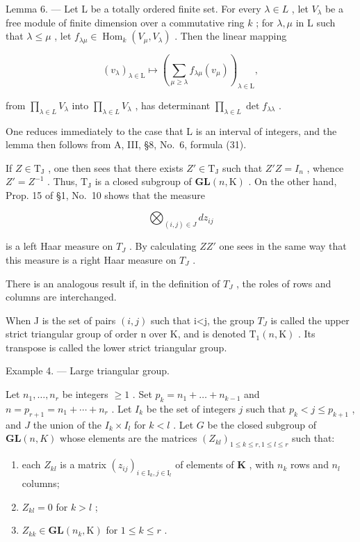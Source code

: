 Lemma 6. --- Let L be a totally ordered finite set. For every \(\lambda \in L\) , let \(V_{\lambda}\) be a free module of finite dimension over a commutative ring \(k\) ; for \(\lambda, \mu\) in L such that \(\lambda \leqslant \mu\) , let \(f_{\lambda \mu} \in \operatorname{Hom}_k(V_\mu, V_\lambda)\) . Then the linear mapping

\[
(v _ {\lambda}) _ {\lambda \in \mathrm{L}} \mapsto \left(\sum_ {\mu \geqslant \lambda} f _ {\lambda \mu} (v _ {\mu})\right) _ {\lambda \in \mathrm{L}},
\]

from \(\prod_{\lambda \in L}V_{\lambda}\) into \(\prod_{\lambda \in L}V_{\lambda}\) , has determinant \(\prod_{\lambda \in L}\det f_{\lambda \lambda}\) .

One reduces immediately to the case that L is an interval of integers, and the lemma then follows from A, III, §8, No.~6, formula (31).

If \(Z \in \mathrm{T}_{\mathrm{J}}\) , one then sees that there exists \(Z' \in \mathrm{T}_{\mathrm{J}}\) such that \(Z'Z = I_n\) , whence \(Z' = Z^{-1}\) . Thus, \(\mathrm{T}_{\mathrm{J}}\) is a closed subgroup of \(\mathbf{GL}(n,\mathrm{K})\) . On the other hand, Prop. 15 of §1, No.~10 shows that the measure

\[
\bigotimes_ {(i, j) \in J} d z _ {i j}
\]

is a left Haar measure on \(T_{J}\) . By calculating \(ZZ'\) one sees in the same way that this measure is a right Haar measure on \(T_{J}\) .

There is an analogous result if, in the definition of \(T_{J}\) , the roles of rows and columns are interchanged.

When J is the set of pairs \((i,j)\) such that i\textless j, the group \(T_{J}\) is called the upper strict triangular group of order n over K, and is denoted \(\mathrm{T}_{1}(n,\mathrm{K})\) . Its transpose is called the lower strict triangular group.

Example 4. --- Large triangular group.

Let \(n_1, \ldots, n_r\) be integers \(\geqslant 1\) . Set \(p_k = n_1 + \ldots + n_{k-1}\) and \(n = p_{r+1} = n_1 + \cdots + n_r\) . Let \(I_k\) be the set of integers \(j\) such that \(p_k < j \leqslant p_{k+1}\) , and \(J\) the union of the \(I_k \times I_l\) for \(k < l\) . Let \(G\) be the closed subgroup of \(\mathbf{GL}(n, K)\) whose elements are the matrices \((Z_{kl})_{1 \leqslant k \leqslant r, 1 \leqslant l \leqslant r}\) such that:

\begin{enumerate}
\def\labelenumi{\arabic{enumi})}
\item
  each \(Z_{kl}\) is a matrix \((z_{ij})_{i\in \mathrm{I}_k,j\in \mathrm{I}_l}\) of elements of \(\mathbf{K}\) , with \(n_k\) rows and \(n_l\) columns;
\item
  \(Z_{kl} = 0\) for \(k > l\) ;
\item
  \(Z_{kk} \in \mathbf{GL}(n_k, \mathrm{K})\) for \(1 \leqslant k \leqslant r\) .
\end{enumerate}

